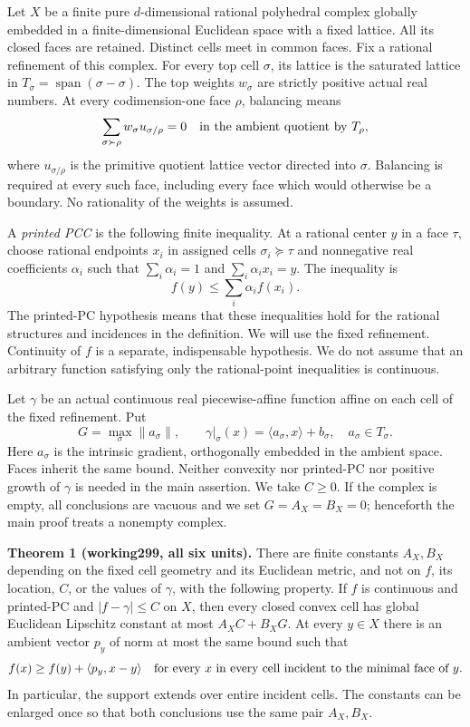 \documentclass[
  11pt,
]{article}
\begin{document}
Let \(X\) be a finite pure \(d\)-dimensional rational polyhedral complex
globally embedded in a finite-dimensional Euclidean space with a fixed
lattice. All its closed faces are retained. Distinct cells meet in
common faces. Fix a rational refinement of this complex. For every top
cell \(\sigma\), its lattice is the saturated lattice in
\(T_\sigma=\operatorname{span}(\sigma-\sigma)\). The top weights
\(w_\sigma\) are strictly positive actual real numbers. At every
codimension-one face \(\rho\), balancing means \[
\sum_{\sigma\succ\rho} w_\sigma u_{\sigma/\rho}=0
\quad\hbox{in the ambient quotient by }T_\rho,
\] where \(u_{\sigma/\rho}\) is the primitive quotient lattice vector
directed into \(\sigma\). Balancing is required at every such face,
including every face which would otherwise be a boundary. No rationality
of the weights is assumed.

A \emph{printed PCC} is the following finite inequality. At a rational
center \(y\) in a face \(\tau\), choose rational endpoints \(x_i\) in
assigned cells \(\sigma_i\succeq\tau\) and nonnegative real coefficients
\(\alpha_i\) such that \(\sum_i\alpha_i=1\) and
\(\sum_i\alpha_i x_i=y\). The inequality is
\[ f(y)\leq\sum_i\alpha_i f(x_i). \] The printed-PC hypothesis means
that these inequalities hold for the rational structures and incidences
in the definition. We will use the fixed refinement. Continuity of \(f\)
is a separate, indispensable hypothesis. We do not assume that an
arbitrary function satisfying only the rational-point inequalities is
continuous.

Let \(\gamma\) be an actual continuous real piecewise-affine function
affine on each cell of the fixed refinement. Put \[
G=\max_\sigma\|a_\sigma\|,
\qquad \gamma|_\sigma(x)=\langle a_\sigma,x\rangle+b_\sigma,
\quad a_\sigma\in T_\sigma.
\] Here \(a_\sigma\) is the intrinsic gradient, orthogonally embedded in
the ambient space. Faces inherit the same bound. Neither convexity nor
printed-PC nor positive growth of \(\gamma\) is needed in the main
assertion. We take \(C\geq0\). If the complex is empty, all conclusions
are vacuous and we set \(G=A_X=B_X=0\); henceforth the main proof treats
a nonempty complex.

\textbf{Theorem 1 (working299, all six units).} There are finite
constants \(A_X,B_X\) depending on the fixed cell geometry and its
Euclidean metric, and not on \(f\), its location, \(C\), or the values
of \(\gamma\), with the following property. If \(f\) is continuous and
printed-PC and \(|f-\gamma|\leq C\) on \(X\), then every closed convex
cell has global Euclidean Lipschitz constant at most \(A_XC+B_XG\). At
every \(y\in X\) there is an ambient vector \(p_y\) of norm at most the
same bound such that \[
f(x)\geq f(y)+\langle p_y,x-y\rangle
\quad\hbox{for every }x\hbox{ in every cell incident to the minimal face of }y.
\] In particular, the support extends over entire incident cells. The
constants can be enlarged once so that both conclusions use the same
pair \(A_X,B_X\).
\end{document}
